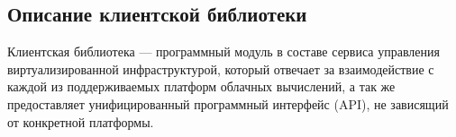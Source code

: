 \subsection{Описание клиентской библиотеки}
Клиентская библиотека --- программный модуль в составе сервиса управления виртуализированной инфраструктурой, который отвечает за взаимодействие с каждой из поддерживаемых платформ облачных вычислений, а так же предоставляет унифицированный программный интерфейс (API), не зависящий от конкретной платформы.

\FloatBarrier
